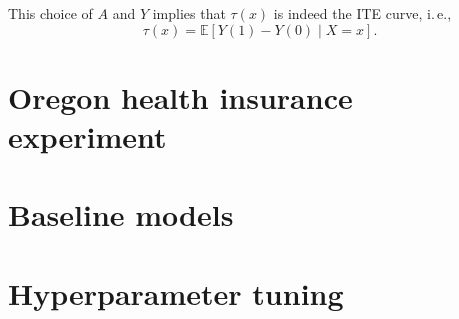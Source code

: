 \documentclass[nonatbib]{article}
\newcommand{\E}{\mathbb{E}}
\newcommand{\ie}{i.\,e.\xspace}
\theoremstyle{definition}
\theoremstyle{plain}
\begin{document}
This choice of $A$ and $Y$ implies that $\tau(x)$ is indeed the ITE curve, \ie,
\begin{equation}
    \tau(x) = \E[Y(1) -Y(0) \mid X = x].
\end{equation}


\clearpage
\section{Oregon health insurance experiment}\label{app:real}

\clearpage
\section{Baseline models}\label{app:baseline}

\clearpage
\section{Hyperparameter tuning}\label{app:hyper}
\end{document}
